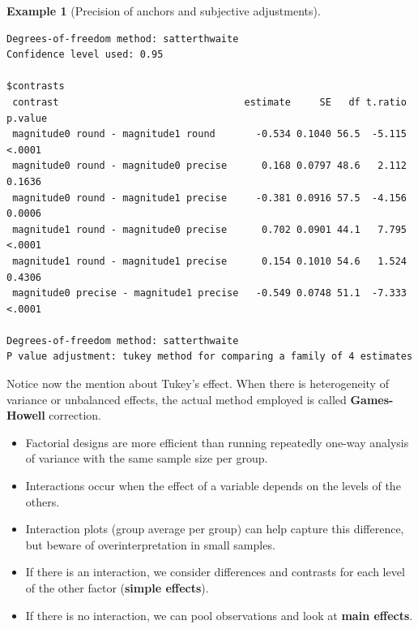\documentclass[
  11pt,
  letterpaper,
]{scrbook}
\providecommand{\tightlist}{%
  \setlength{\itemsep}{0pt}\setlength{\parskip}{0pt}}\usepackage{longtable,booktabs,array}
\theoremstyle{definition}
\newtheorem{example}{Example}[chapter]
\theoremstyle{definition}
\theoremstyle{remark}
\begin{document}
\begin{example}[Precision of anchors and subjective
adjustments]
\begin{verbatim}
Degrees-of-freedom method: satterthwaite 
Confidence level used: 0.95 

$contrasts
 contrast                                estimate     SE   df t.ratio p.value
 magnitude0 round - magnitude1 round       -0.534 0.1040 56.5  -5.115  <.0001
 magnitude0 round - magnitude0 precise      0.168 0.0797 48.6   2.112  0.1636
 magnitude0 round - magnitude1 precise     -0.381 0.0916 57.5  -4.156  0.0006
 magnitude1 round - magnitude0 precise      0.702 0.0901 44.1   7.795  <.0001
 magnitude1 round - magnitude1 precise      0.154 0.1010 54.6   1.524  0.4306
 magnitude0 precise - magnitude1 precise   -0.549 0.0748 51.1  -7.333  <.0001

Degrees-of-freedom method: satterthwaite 
P value adjustment: tukey method for comparing a family of 4 estimates 
\end{verbatim}

Notice now the mention about Tukey's effect. When there is heterogeneity
of variance or unbalanced effects, the actual method employed is called
\textbf{Games-Howell} correction.

\end{example}

\begin{tcolorbox}[enhanced jigsaw, bottomrule=.15mm, coltitle=black, colframe=quarto-callout-important-color-frame, left=2mm, opacityback=0, breakable, opacitybacktitle=0.6, rightrule=.15mm, toprule=.15mm, title=\textcolor{quarto-callout-important-color}{\faExclamation}\hspace{0.5em}{\textbf{Summary}}, toptitle=1mm, leftrule=.75mm, titlerule=0mm, colback=white, arc=.35mm, bottomtitle=1mm, colbacktitle=quarto-callout-important-color!10!white]

\begin{itemize}
\tightlist
\item
  Factorial designs are more efficient than running repeatedly one-way
  analysis of variance with the same sample size per group.
\item
  Interactions occur when the effect of a variable depends on the levels
  of the others.
\item
  Interaction plots (group average per group) can help capture this
  difference, but beware of overinterpretation in small samples.
\item
  If there is an interaction, we consider differences and contrasts for
  each level of the other factor (\textbf{simple effects}).
\item
  If there is no interaction, we can pool observations and look at
  \textbf{main effects}.
\end{itemize}

\end{tcolorbox}
\end{document}
